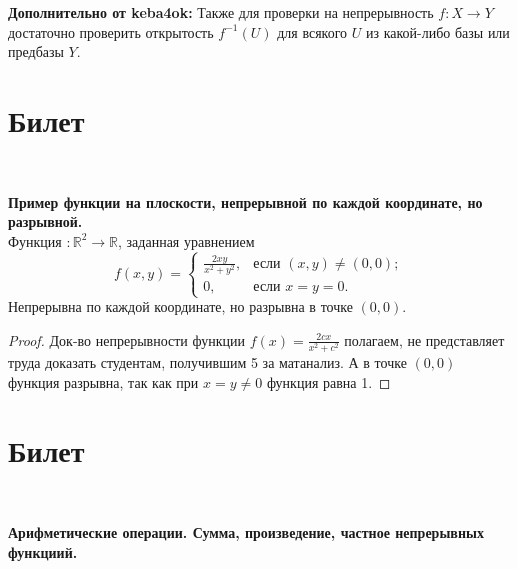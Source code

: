 \documentclass[a4paper,100pt]{article}
\theoremstyle{indented}
\begin{document}
\textbf{Дополнительно от keba4ok:} Также для проверки на непрерывность $f: X \to Y$ достаточно проверить открытость $f^{-1}(U)$ для всякого $U$ из какой-либо базы или предбазы $Y$.

\section{Билет} \

\medskip

\textbf{Пример функции на плоскости, непрерывной по каждой координате, но разрывной.}\\
    
    Функция $: \mathbb R^2 \rightarrow \mathbb R$, заданная уравнением 
    \[
    f(x,y) = 
    \begin{cases} 
        \frac{2xy}{x^2+y^2}, &\text{если } (x,y) \neq (0,0); \\
        0, &\text{если } x = y = 0.
    \end{cases}
    \]
    Непрерывна по каждой координате, но разрывна в точке $(0,0)$.
    \begin{proof}
        Док-во непрерывности функции $f(x) = \frac{2cx}{x^2+c^2}$ полагаем, не представляет труда доказать студентам, получившим 5 за матанализ. А в точке $(0,0)$ функция разрывна, так как при $x = y \neq 0$ функция равна 1. 
    \end{proof}

\section{Билет} \

\medskip

\textbf{Арифметические операции. Сумма, произведение, частное непрерывных функциий.}\\
\end{document}
